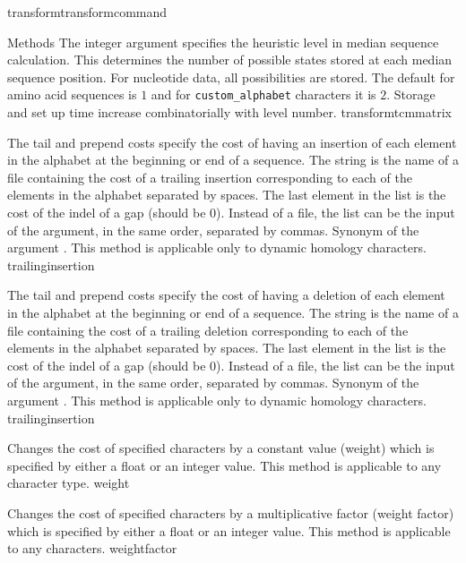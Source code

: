 \begin{command}{transform}{transformcommand}
\begin{arguments}
\begin{argumentgroup}{Methods}
{            The integer argument specifies the heuristic level in median sequence calculation.  
            This determines the number of possible states stored at each median sequence position.  
            For nucleotide data, all possibilities are stored.  The default for amino acid sequences is $1$
            and for \texttt{custom\_alphabet} characters it is $2$.  Storage and set up time increase combinatorially with
            level number.}
            {transformtcmmatrix}

            {The tail and prepend costs specify the cost of having an insertion of
            each element in the alphabet at the beginning or end
            of a sequence. The string is the name of a file containing the cost of
            a trailing insertion corresponding to each of the elements
            in the alphabet separated by spaces. The last element in the list is the
            cost of the indel of a gap (should be 0). Instead of a file, the list can
            be the input of the argument, in the same order, separated by commas.
            Synonym of the argument . This method is applicable only to dynamic homology characters.} 
            {trailinginsertion}

            {The tail and prepend costs specify the cost of having a deletion
            of each element in the alphabet at the beginning or end
            of a sequence. The string is the name of a file containing the cost of
            a trailing deletion corresponding to each of the elements
            in the alphabet separated by spaces. The last element in the list is the
            cost of the indel of a gap (should be 0). Instead of a file, the list can
            be the input of the argument, in the same order, separated by commas.
            Synonym of the argument . This method is applicable only to dynamic homology characters.} 
            {trailinginsertion}
            
            {Changes the cost of specified characters by a
            constant value (weight) which is specified by either a
            float or an integer value. This method is applicable to any character type.} 
            {weight}

            {Changes the cost of specified characters by a
            multiplicative factor (weight factor) which is specified by either a
            float or an integer value. This method is applicable to any characters.} 
            {weightfactor}


\end{argumentgroup}
\end{arguments}
\end{command}
